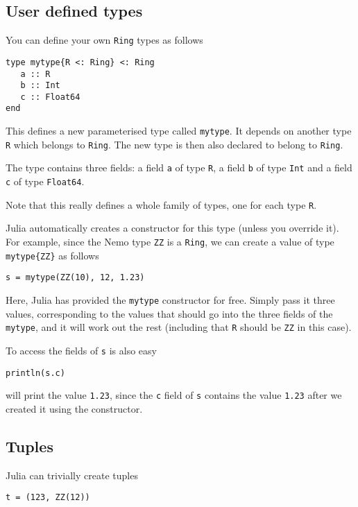 \documentclass[a4paper,10pt]{article}
\newcommand{\code}{\lstinline}
\begin{document}
{\subsection{User defined types}

You can define your own \code{Ring} types as follows

\begin{lstlisting}
type mytype{R <: Ring} <: Ring
   a :: R
   b :: Int
   c :: Float64
end
\end{lstlisting}

This defines a new parameterised type called \code{mytype}. It depends on another type
\code{R} which belongs to \code{Ring}. The new type is then also declared to belong to
\code{Ring}.

The type contains three fields: a field \code{a} of type \code{R}, a field \code{b} of
type \code{Int} and a field \code{c} of type \code{Float64}.

Note that this really defines a whole family of types, one for each type \code{R}.

Julia automatically creates a constructor for this type (unless you override it). For
example, since the Nemo type \code{ZZ} is a \code{Ring}, we can create a value of
type \code|mytype{ZZ}| as follows

\begin{lstlisting}
s = mytype(ZZ(10), 12, 1.23)
\end{lstlisting}

Here, Julia has provided the \code{mytype} constructor for free. Simply pass it three
values, corresponding to the values that should go into the three fields of the 
\code{mytype}, and it will work out the rest (including that \code{R} should be
\code{ZZ} in this case).

To access the fields of \code{s} is also easy

\begin{lstlisting}
println(s.c)
\end{lstlisting}

will print the value \code{1.23}, since the \code{c} field of \code{s} contains the
value \code{1.23} after we created it using the constructor.

\subsection{Tuples}

Julia can trivially create tuples

\begin{lstlisting}
t = (123, ZZ(12))
\end{lstlisting}

}
\end{document}
